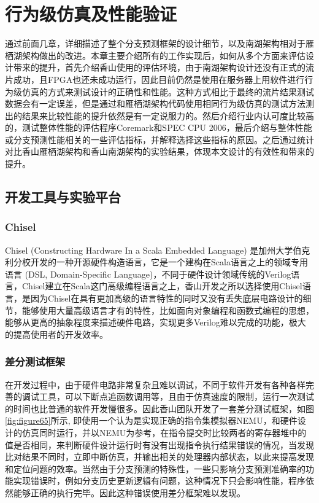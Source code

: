 \chapter{行为级仿真及性能验证}

通过前面几章，详细描述了整个分支预测框架的设计细节，以及南湖架构相对于雁栖湖架构做出的改进。本章主要介绍所有的工作实现后，如何从多个方面来评估设计带来的提升，首先介绍香山使用的评估环境，由于南湖架构设计还没有正式的流片成功，且FPGA也还未成功运行，因此目前仍然是使用在服务器上用软件进行行为级仿真的方式来测试设计的正确性和性能。这种方式相比于最终的流片结果测试数据会有一定误差，但是通过和雁栖湖架构代码使用相同行为级仿真的测试方法测出的结果来比较性能的提升依然是有一定说服力的。然后介绍行业内认可度比较高的，测试整体性能的评估程序Coremark和SPEC CPU 2006，最后介绍与整体性能或分支预测性能相关的一些评估指标，并解释选择这些指标的原因。之后通过统计对比香山雁栖湖架构和香山南湖架构的实验结果，体现本文设计的有效性和带来的提升。

\section{开发工具与实验平台}

\subsection{Chisel}

Chisel (Constructing Hardware In a Scala Embedded Language) 是加州大学伯克利分校开发的一种开源硬件构造语言，它是一个建构在Scala语言\cite{scala}之上的领域专用语言 (DSL, Domain-Specific Language)，不同于硬件设计领域传统的Verilog语言，Chisel建立在Scala这门高级编程语言之上，香山开发之所以选择使用Chisel语言，是因为Chisel在具有更加高级的语言特性的同时又没有丢失底层电路设计的细节，能够使用大量高级语言才有的特性，比如面向对象编程和函数式编程的思想，能够从更高的抽象程度来描述硬件电路，实现更多Verilog难以完成的功能，极大的提高使用者的开发效率。

\subsection{差分测试框架}

在开发过程中，由于硬件电路非常复杂且难以调试，不同于软件开发有各种各样完善的调试工具，可以下断点追函数调用等，且由于仿真速度的限制，运行一次测试的时间也比普通的软件开发慢很多。因此香山团队开发了一套差分测试框架，如图\ref{fig:figure65}所示, 即使用一个认为是实现正确的指令集模拟器NEMU\cite{nemu}，和硬件设计的仿真同时运行，并以NEMU为参考，在指令提交时比较两者的寄存器堆中的值是否相同，来判断硬件设计运行时有没有出现指令执行结果错误的情况，当发现比对结果不同时，立即中断仿真，并输出相关的处理器内部状态，以此来提高发现和定位问题的效率。当然由于分支预测的特殊性，一些只影响分支预测准确率的功能实现错误时，例如分支历史更新逻辑有问题，这种情况下只会影响性能，程序依然能够正确的执行完毕。因此这种错误使用差分框架难以发现。

